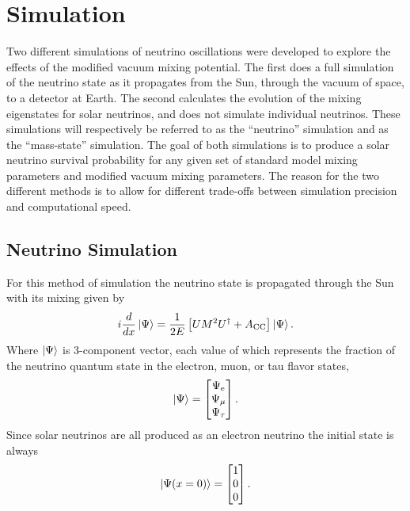 \section{Simulation}
Two different simulations of neutrino oscillations were developed to explore the
effects of the modified vacuum mixing potential.
The first
does a full simulation of the neutrino state as it propagates from the
Sun, through the vacuum of space, to a detector at Earth.
The second calculates the evolution
of the mixing eigenstates for solar neutrinos, and does not simulate individual
neutrinos.
These simulations will respectively be referred to as the ``neutrino'' simulation
and as the ``mass-state'' simulation.
The goal of both simulations is to produce a solar neutrino survival probability
for any given set of standard model mixing parameters and modified vacuum
mixing parameters.
The reason for the two different methods is to allow for different
trade-offs between simulation precision and computational speed.

\subsection{Neutrino Simulation}
For this method of simulation the neutrino state is propagated through the
Sun with its mixing given by
\begin{equation}
    i\frac{d}{dx}\ket{\Psi} =\frac{1}{2E}\left[UM^{2}U^{\dagger} + A_{\mathrm{CC}}\right]\ket{\Psi}\text{.}
    \label{eqn:mixing_schrodinger}
\end{equation}
Where $\ket{\Psi}$ is 3-component vector, each value of which represents
the fraction of the neutrino quantum state in the electron, muon, or tau flavor states,
\begin{equation}
\ket{\Psi} = 
\begin{bmatrix}
    \Psi_{\mathrm{e}}\\
    \Psi_{\mathrm{\mu}}\\
    \Psi_{\mathrm{\tau}}\\
\end{bmatrix}\mathrm{.}
\end{equation}
Since solar neutrinos are all produced as an electron neutrino the
initial state is always
\begin{equation}
\ket{\Psi(x=0)} = 
\begin{bmatrix}
1\\
0\\
0\\
\end{bmatrix}\mathrm{.}
\end{equation}

